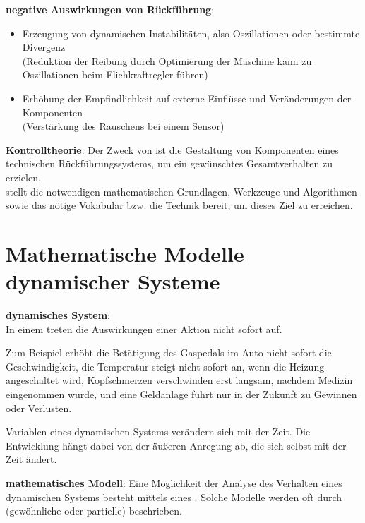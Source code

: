 \textbf{negative Auswirkungen von Rückführung}:
\begin{itemize}
    \item
    Erzeugung von dynamischen Instabilitäten, also Oszillationen oder bestimmte Divergenz\\
    (Reduktion der Reibung durch Optimierung der Maschine kann zu Oszillationen beim
    Fliehkraftregler führen)

    \item
    Erhöhung der Empfindlichkeit auf externe Einflüsse und Veränderungen der Komponenten\\
    (Verstärkung des Rauschens bei einem Sensor)
\end{itemize}

\linie

\textbf{Kontrolltheorie}:
Der Zweck von  ist die Gestaltung von Komponenten eines
technischen Rückführungssystems, um ein gewünschtes Gesamtverhalten zu erzielen.\\
 stellt die notwendigen mathematischen Grundlagen,
Werkzeuge und Algorithmen sowie das nötige Vokabular bzw. die Technik bereit, um dieses Ziel zu
erreichen.

\pagebreak

\section{%
    Mathematische Modelle dynamischer Systeme%
}

\textbf{dynamisches System}:\\
In einem  treten die Auswirkungen einer Aktion nicht sofort auf.

Zum Beispiel erhöht die Betätigung des Gaspedals im Auto nicht sofort die Geschwindigkeit,
die Temperatur steigt nicht sofort an, wenn die Heizung angeschaltet wird,
Kopfschmerzen verschwinden erst langsam, nachdem Medizin eingenommen wurde, und
eine Geldanlage führt nur in der Zukunft zu Gewinnen oder Verlusten.

Variablen eines dynamischen Systems verändern sich mit der Zeit.
Die Entwicklung hängt dabei von der äußeren Anregung ab, die sich selbst mit der Zeit ändert.

\linie

\textbf{mathematisches Modell}:
Eine Möglichkeit der Analyse des Verhalten eines dynamischen Systems besteht mittels eines
.
Solche Modelle werden oft durch (gewöhnliche oder partielle)
 beschrieben.

